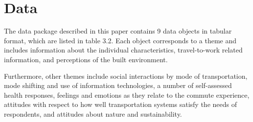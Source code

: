 \documentclass[
11pt, %
oneside, %
english, %
singlespacing, %
]{macthesis} %
\begin{document}
\hypertarget{data}{%
\section{Data}\label{data}}

The data package described in this paper contains 9 data objects in tabular format, which are listed in table 3.2. Each object corresponds to a theme and includes information about the individual characteristics, travel-to-work related information, and perceptions of the built environment.

Furthermore, other themes include social interactions by mode of transportation, mode shifting and use of information technologies, a number of self-assessed health responses, feelings and emotions as they relate to the commute experience, attitudes with respect to how well transportation systems satisfy the needs of respondents, and attitudes about nature and sustainability.
\end{document}
